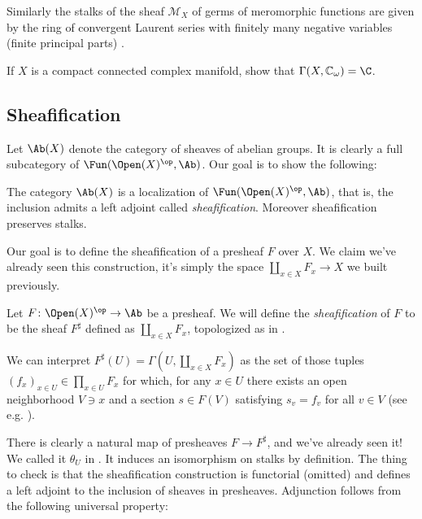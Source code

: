\documentclass[11pt]{amsart}
\begin{document}
\begin{example} Similarly the stalks of the sheaf $\mathcal{M}_X$ of germs of meromorphic functions are given by the ring of convergent Laurent series with finitely many negative variables (finite principal parts) \cite[p.~42]{Forster}.
\end{example}

\begin{exercise} If $X$ is a compact connected complex manifold, show that $\Gamma(X, \mathbb{C}_\omega) = \C$.
\end{exercise}

\subsection{Sheafification}

Let $\Ab(X)$ denote the category of sheaves of abelian groups. It is clearly a full subcategory of $\Fun(\Open(X)^\op,\Ab)$. Our goal is to show the following:

\begin{theorem} The category $\Ab(X)$ is a localization of $\Fun(\Open(X)^\op,\Ab)$, that is, the inclusion admits a left adjoint called \emph{sheafification}. Moreover sheafification preserves stalks.
\end{theorem}

Our goal is to define the sheafification of a presheaf $F$ over $X$. We claim we've already seen this construction, it's simply the space $\amalg_{x\in X}F_x \to X$ we built previously.

\begin{definition}\label{def:sheafification}
Let $F \colon \Open(X)^\op \to \Ab$ be a presheaf. We will define the \emph{sheafification} of $F$ to be the sheaf $F^\sharp$ defined as $\amalg_{x\in X} F_x$, topologized as in .
\end{definition}

\begin{remark}\label{rmk:interpretation-of-sheafification}
We can interpret $F^\sharp(U) = \Gamma(U,\amalg_{x\in X}F_x)$ as the set of those tuples $(f_x)_{x\in U} \in \prod_{x\in U} F_x$ for which, for any $x\in U$ there exists an open neighborhood $V\ni x$ and a section $s\in F(V)$ satisfying $s_v = f_v$ for all $v\in V$ (see e.g. \cite[007X]{Stacks}).
\end{remark}

There is clearly a natural map of presheaves $F \to F^\sharp$, and we've already seen it! We called it $\theta_U$ in . It induces an isomorphism on stalks by definition. The thing to check is that the sheafification construction is functorial (omitted) and defines a left adjoint to the inclusion of sheaves in presheaves. Adjunction follows from the following universal property:
\end{document}
